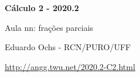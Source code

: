 \documentclass[oneside,12pt]{article}
\begin{document}


\long{}
\long{}
\long{}
\long{}
\long{}
\long{}
\long{}
\long{}
\long{}
\long{}
\long{}

\long{}
\long{}

\def\frown{\ensuremath{{=}{(}}}
\def\True {\mathbf{V}}
\def\False{\mathbf{F}}
\def\D    {\displaystyle}

\def\together   {\mathsf{together}}
\def\togetherp#1{\mathsf{together}\left(#1\right)}
\def\apart   {\mathsf{apart}}

\def\drafturl{http://angg.twu.net/LATEX/2020-2-C2.pdf}
\def\drafturl{http://angg.twu.net/2020.2-C2.html}
\def\draftfooter{\tiny \href{\drafturl}{\jobname{}} \ColorBrown{\shorttoday{} \hours}}



%

\thispagestyle{empty}

\begin{center}

\vspace*{1.2cm}

{\bf \Large Cálculo 2 - 2020.2}

\bsk

Aula nn: frações parciais

\bsk

Eduardo Ochs - RCN/PURO/UFF

\url{http://angg.twu.net/2020.2-C2.html}

\end{center}
\end{document}
